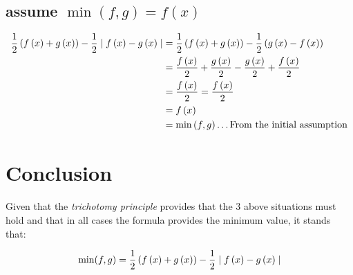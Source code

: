 \documentclass[class=article, crop=false]{standalone}
\begin{document}
\subsection{assume $\min{\left( f, g \right)} = f \left( x \right)$}

\begin{align}
\frac{1}{2} \left( f\left( x \right) + g\left( x \right) \right) - \frac{1}{2} \mid f\left( x \right) -g\left( x \right) \mid
&= \frac{1}{2} \left( f\left( x \right) + g\left( x \right) \right) - \frac{1}{2} \left( g\left( x \right) - f\left( x \right) \right) \notag \\
&= \frac{f\left( x \right)}{2} + \frac{g\left( x \right)}{2} - \frac{g\left( x \right)}{2}  +   \frac{f\left( x \right)}{2} \notag  \\
&= \frac{f\left( x \right)}{2} = \frac{f\left( x \right)}{2} \notag \\
&= f\left( x \right) \notag \\
&= \min{\left( f, g \right)} \dots \text{From the initial assumption}
\end{align}

\section{Conclusion}
Given that the \textit{trichotomy principle} provides that the 3 above situations must hold and that in all cases the formula provides the minimum value, it stands that:

\begin{align}
  \text{min}(f,g) = \frac{1}{2} \left( f\left( x \right) + g\left( x \right) \right) - \frac{1}{2} \mid f\left( x \right) -g\left( x \right) \mid \notag
\end{align}
\end{document}
